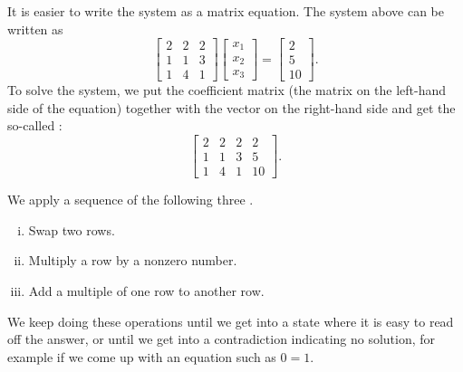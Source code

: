 It is easier to write the system as a matrix equation.
The system above can be
written as
\begin{equation*}
\begin{bmatrix}
2 & 2 & 2 \\
1 & 1 & 3 \\
1 & 4 & 1 
\end{bmatrix}
\begin{bmatrix}
x_1 \\
x_2 \\
x_3
\end{bmatrix} 
=
\begin{bmatrix}
2 \\
5 \\
10
\end{bmatrix} .
\end{equation*}
To solve the system,
we put the coefficient matrix (the matrix on the
left-hand side of the equation) together with the vector on the right-hand side
and get the
so-called
\emph{}:
\begin{equation*}
\left[
\begin{array}{ccc|c}
2 & 2 & 2 & 2 \\
1 & 1 & 3 & 5 \\
1 & 4 & 1 & 10
\end{array}
\right] .
\end{equation*}

\pagebreak[2]
We apply a sequence of the following three
\emph{}.
\begin{enumerate}[(i)]
\item Swap two rows.
\item Multiply a row by a nonzero number.
\item Add a multiple of one row to another row.
\end{enumerate}
We keep doing these operations until we get into a state where it is
easy to read off the answer, or until we get into a contradiction indicating
no solution, for example if we come up with an equation such as $0=1$.

